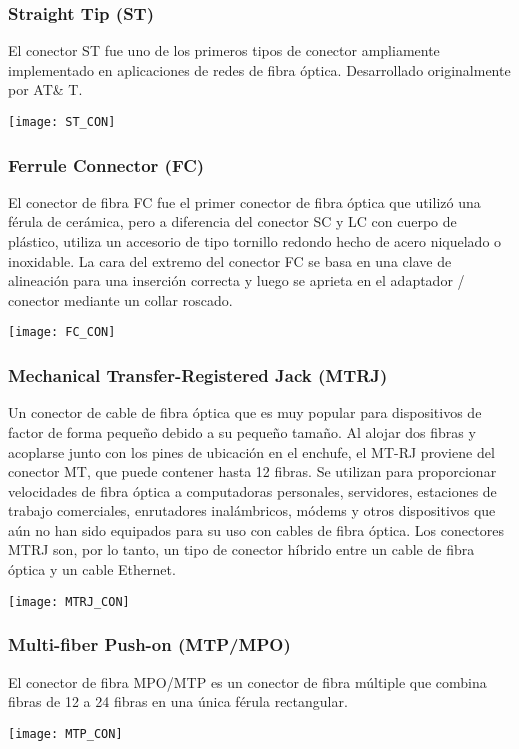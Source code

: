 \subsubsection*{Straight Tip (ST)}
El conector ST fue uno de los primeros tipos de conector ampliamente implementado en aplicaciones de redes de fibra óptica. Desarrollado originalmente por AT\& T.
\begin{center}
\texttt{[image: ST\_CON]}
\end{center}
\subsubsection*{Ferrule Connector (FC)}
El conector de fibra FC fue el primer conector de fibra óptica que utilizó una férula de cerámica, pero a diferencia del conector SC y LC con cuerpo de plástico, utiliza un accesorio de tipo tornillo redondo hecho de acero niquelado o inoxidable. La cara del extremo del conector FC se basa en una clave de alineación para una inserción correcta y luego se aprieta en el adaptador / conector mediante un collar roscado.
\begin{center}
\texttt{[image: FC\_CON]}
\end{center}
\subsubsection*{Mechanical Transfer-Registered Jack (MTRJ)}
Un conector de cable de fibra óptica que es muy popular para dispositivos de factor de forma pequeño debido a su pequeño tamaño. Al alojar dos fibras y acoplarse junto con los pines de ubicación en el enchufe, el MT-RJ proviene del conector MT, que puede contener hasta 12 fibras. Se utilizan para proporcionar velocidades de fibra óptica a computadoras personales, servidores, estaciones de trabajo comerciales, enrutadores inalámbricos, módems y otros dispositivos que aún no han sido equipados para su uso con cables de fibra óptica. Los conectores MTRJ son, por lo tanto, un tipo de conector híbrido entre un cable de fibra óptica y un cable Ethernet.

\begin{center}
\texttt{[image: MTRJ\_CON]}
\end{center}
\subsubsection*{Multi-fiber Push-on (MTP/MPO)}
El conector de fibra MPO/MTP es un conector de fibra múltiple que combina fibras de 12 a 24 fibras en una única férula rectangular.
\begin{center}
\texttt{[image: MTP\_CON]}
\end{center}
